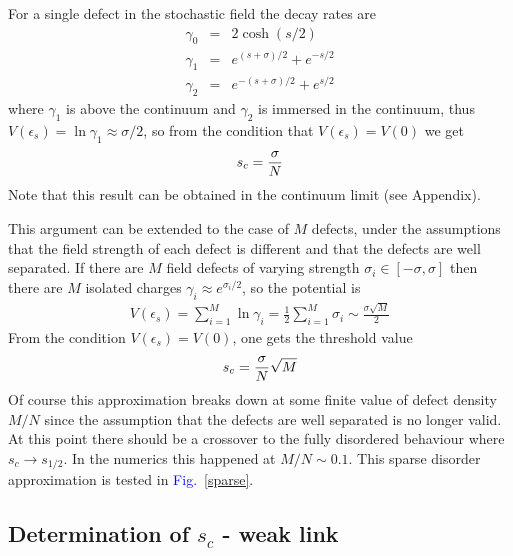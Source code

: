 \documentclass[aps,pre,floats,floatfix,twocolumn]{revtex4}
\newcommand{\be}[1]{\begin{eqnarray}\ifthenelse{#1=-1}{\nonumber}{\ifthenelse{#1=0}{}{\label{e#1}}}}
\newcommand{\beq}{\begin{eqnarray}}
\newcommand{\eeq}{\end{eqnarray}}
\newcommand{\Fig}[1]{\textcolor{blue}{Fig.}\!\!~\ref{#1}}
\begin{document}
For a single defect in the stochastic field the decay rates are 
%
\beq
\gamma_0  &=& 2\cosh(s/2)\\
\gamma_1  &=& e^{(s+\sigma)/2} + e^{-s/2} \\
\gamma_2  &=& e^{-(s+\sigma)/2} + e^{s/2}
\eeq
%
where $\gamma_1$ is above the continuum and 
$\gamma_2$  is immersed in the continuum, 
thus $V(\epsilon_s) = \ln\gamma_1 \approx \sigma/2$, so from the condition that $V(\epsilon_s)=V(0)$ 
we get 
%
\be{32} 
s_c = \frac{\sigma}{N}
\eeq 
%
Note that this result can be obtained in the continuum limit (see Appendix).

%
This argument can be extended to the case of $M$ defects, under the assumptions that
the field strength of each defect is different and that the defects are well separated. 
If there are $M$ field defects of varying strength $\sigma_i \in [-\sigma, \sigma]$ then there are
$M$ isolated charges $\gamma_i \approx e^{\sigma_i/2}$, so the potential is 
%
\beq
V(\epsilon_s) = \sum_{i=1}^M \ln \gamma_i  = \frac{1}{2}\sum_{i=1}^M \sigma_i \sim \frac{\sigma\sqrt{M}}{2}
\eeq
From  the condition ${V(\epsilon_s)=V(0)}$, one gets the threshold value 
%
\be{33}
s_c =\frac{ \sigma}{N}\sqrt{M}
\eeq
%
Of course this approximation breaks down at some finite value 
of defect density $M/N$ since the assumption that the defects are well separated is no longer valid. 
At this point there should be a crossover to the fully disordered behaviour where ${s_c \rightarrow s_{1/2}}$.
In the numerics this happened at $M/N \sim 0.1$. 
This sparse disorder approximation is tested in \Fig{sparse}.



\subsection{Determination of $s_c$ - weak link}
\end{document}
